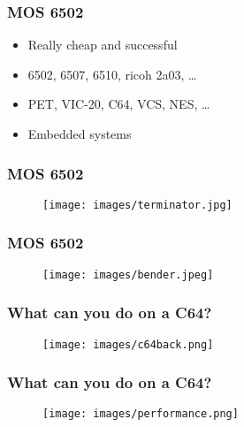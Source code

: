 \documentclass[aspectratio=43]{uva-inf-presentation}
\begin{document}

\begin{frame}
\frametitle{MOS 6502}

\begin{itemize}
\item Really cheap and successful
\item 6502, 6507, 6510, ricoh 2a03, \dots
\item PET, VIC-20, C64, VCS, NES, \dots
\item Embedded systems
\end{itemize}

\end{frame}


\begin{frame}
\frametitle{MOS 6502}

\begin{figure}
\texttt{[image: images/terminator.jpg]}
\end{figure}

\end{frame}


\begin{frame}
\frametitle{MOS 6502}

\begin{figure}
\texttt{[image: images/bender.jpeg]}
\end{figure}

\end{frame}


\begin{frame}
\frametitle{What can you do on a C64?}

\begin{figure}
\texttt{[image: images/c64back.png]}
\end{figure}

\end{frame}


\begin{frame}
\frametitle{What can you do on a C64?}

\begin{figure}
\texttt{[image: images/performance.png]}
\end{figure}

\end{frame}
\end{document}
